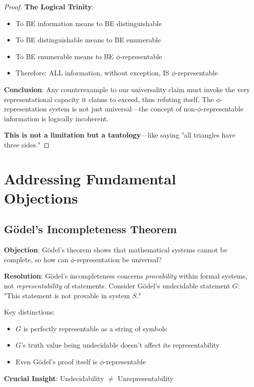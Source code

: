 \documentclass[12pt,letterpaper]{article}
\begin{document}
\begin{proof}
\textbf{The Logical Trinity}:
\begin{itemize}
\item To BE information means to BE distinguishable
\item To BE distinguishable means to BE enumerable  
\item To BE enumerable means to BE $\phi$-representable
\item Therefore: ALL information, without exception, IS $\phi$-representable
\end{itemize}

\textbf{Conclusion}: Any counterexample to our universality claim must invoke the very representational capacity it claims to exceed, thus refuting itself. The $\phi$-representation system is not just universal—the concept of non-$\phi$-representable information is logically incoherent.

\textbf{This is not a limitation but a tautology}—like saying "all triangles have three sides."
\end{proof}

\section{Addressing Fundamental Objections}

\subsection{Gödel's Incompleteness Theorem}

\textbf{Objection}: Gödel's theorem shows that mathematical systems cannot be complete, so how can $\phi$-representation be universal?

\textbf{Resolution}: Gödel's incompleteness concerns \textit{provability} within formal systems, not \textit{representability} of statements. Consider Gödel's undecidable statement $G$: "This statement is not provable in system $S$."

Key distinctions:
\begin{itemize}
\item $G$ is perfectly representable as a string of symbols
\item $G$'s truth value being undecidable doesn't affect its representability  
\item Even Gödel's proof itself is $\phi$-representable
\end{itemize}

\textbf{Crucial Insight}: Undecidability $\neq$ Unrepresentability
\end{document}
